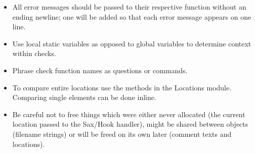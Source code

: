 \documentclass[12pt]{report}
\begin{document}
\begin{itemize}
\item All error messages should be passed to their respective function without an ending newline; one 
will be added so that each error message appears on one line.
\item Use local static variables as opposed to global variables to determine context within checks.
\item Phrase check function names as questions or commands.
\item To compare entire locations use the methods in the Locations module. Comparing single elements can be done inline. 
\item Be careful not to free things which were either never allocated (the current location passed to the Sax/Hook handler), might be shared between objects (filename strings) or will be freed on its own later (comment texts and locations).
\end{itemize}

\nocite{*}

\clearpage
{}
{}

\end{document}
